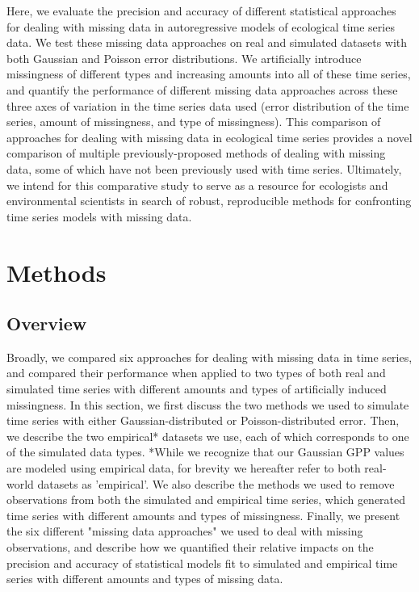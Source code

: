 \documentclass{article}
\begin{document}
Here, we evaluate the precision and accuracy of different statistical approaches for dealing with missing data in autoregressive models of ecological time series data. We test these missing data approaches on real and simulated datasets with both Gaussian and Poisson error distributions. We artificially introduce missingness of different types and increasing amounts into all of these time series, and quantify the performance of different missing data approaches across these three axes of variation in the time series data used (error distribution of the time series, amount of missingness, and type of missingness). This comparison of approaches for dealing with missing data in ecological time series provides a novel comparison of multiple previously-proposed methods of dealing with missing data, some of which have not been previously used with time series. Ultimately, we intend for this comparative study to serve as a resource for ecologists and environmental scientists in search of robust, reproducible methods for confronting time series models with missing data.


\section*{Methods} 

\subsection*{Overview}

Broadly, we compared six approaches for dealing with missing data in time series, and compared their performance when applied to two types of both real and simulated time series with different amounts and types of artificially induced missingness. %
In this section, we first discuss the two methods we used to simulate time series with either Gaussian-distributed or Poisson-distributed error. Then, we describe the two empirical* datasets we use, each of which corresponds to one of the simulated data types. *While we recognize that our Gaussian GPP values are modeled using empirical data, for brevity we hereafter refer to both real-world datasets as 'empirical'. We also describe the methods we used to remove observations from both the simulated and empirical time series, which generated time series with different amounts and types of missingness. Finally, we present the six different "missing data approaches" we used to deal with missing observations, and describe how we quantified their relative impacts on the precision and accuracy of statistical models fit to simulated and empirical time series with different amounts and types of missing data.   
\end{document}
